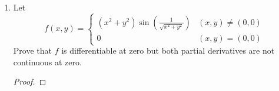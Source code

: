 \documentclass[../psets.tex]{subfiles}
\begin{document}
\begin{enumerate}
\begin{enumerate}
\begin{proof}
        \end{proof}
        \item Let
        \begin{equation*}
            f(x,y) =
            \begin{cases}
                (x^2+y^2)\sin\left( \frac{1}{\sqrt{x^2+y^2}} \right) & (x,y)\neq(0,0)\\
                0 & (x,y)=(0,0)
            \end{cases}
        \end{equation*}
        Prove that $f$ is differentiable at zero but both partial derivatives are not continuous at zero.
        \begin{proof}


\end{proof}
\end{enumerate}
\end{enumerate}
\end{document}
